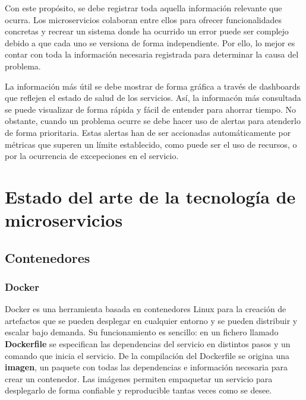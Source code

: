 \documentclass[11pt,spanish,listoffigures]{tfgetsinf}
\begin{document}
Con este propósito, se debe registrar toda aquella información relevante que ocurra. Los microservicios colaboran entre ellos para ofrecer funcionalidades concretas y recrear un sistema donde ha ocurrido un error puede ser complejo debido a que cada uno se versiona de forma independiente. Por ello, lo mejor es contar con toda la información necesaria registrada para determinar la causa del problema.

La información más útil se debe mostrar de forma gráfica a través de dashboards que reflejen el estado de salud de los servicios. Así, la informacón más consultada se puede visualizar de forma rápida y fácil de entender para ahorrar tiempo. No obstante, cuando un problema ocurre se debe hacer uso de alertas para atenderlo de forma prioritaria. Estas alertas han de ser accionadas automáticamente por métricas que superen un límite establecido, como puede ser el uso de recursos, o por la ocurrencia de excepeciones en el servicio. \cite{FowlerSusan}

%

\chapter{Estado del arte de la tecnología de microservicios}

\section{Contenedores}

\subsection{Docker}

Docker es una herramienta basada en contenedores Linux para la creación de artefactos que se pueden desplegar en cualquier entorno y se pueden distribuir y escalar bajo demanda. \cite{Matthias} Su funcionamiento es sencillo: en un fichero llamado \textbf{Dockerfile} se especifican las dependencias del servicio en distintos pasos y un comando que inicia el servicio. De la compilación del Dockerfile se origina una \textbf{imagen}, un paquete con todas las dependencias e información necesaria para crear un contenedor. Las imágenes permiten empaquetar un servicio para desplegarlo de forma confiable y reproducible tantas veces como se desee. \cite{DelaTorre2018}
\end{document}
